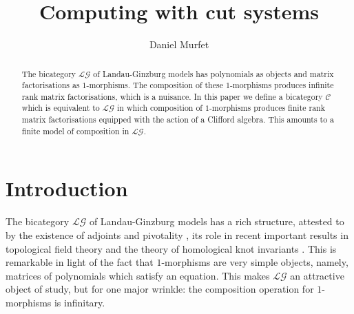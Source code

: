 \documentclass[english,letter paper,12pt,leqno]{article}
\theoremstyle{example}
\numberwithin{equation}{section}
\def\res{\operatorname{Res}}
\def\LG{\mathcal{LG}}
\def\L{\mathcal{C}}
\begin{document}
\def\Res{\res\!}
\newcommand{\ud}{\mathrm{d}}
\newcommand{\Ress}[1]{\res_{#1}\!}
\newcommand{\cat}[1]{\mathcal{#1}}
\newcommand{\lto}{\longrightarrow}
\newcommand{\xlto}[1]{\stackrel{#1}\lto}
\newcommand{\mf}[1]{\mathfrak{#1}}
\newcommand{\md}[1]{\mathscr{#1}}
\def\sus{\l}
\def\l{\,|\,}
\def\sgn{\textup{sgn}}

\title{Computing with cut systems}
\author{Daniel Murfet}

\maketitle

\begin{abstract}
The bicategory $\LG$ of Landau-Ginzburg models has polynomials as objects and matrix factorisations as $1$-morphisms. The composition of these $1$-morphisms produces infinite rank matrix factorisations, which is a nuisance. In this paper we define a bicategory $\L$ which is equivalent to $\LG$ in which composition of $1$-morphisms produces finite rank matrix factorisations equipped with the action of a Clifford algebra. This amounts to a finite model of composition in $\LG$.
\end{abstract}

\tableofcontents

\section{Introduction}

The bicategory $\LG$ of Landau-Ginzburg models has a rich structure, attested to by the existence of adjoints and pivotality \cite{lgdual}, its role in recent important results in topological field theory \cite{genorb,ade} and the theory of homological knot invariants \cite{kr0401268}. This is remarkable in light of the fact that $1$-morphisms are very simple objects, namely, matrices of polynomials which satisfy an equation. This makes $\LG$ an attractive object of study, but for one major wrinkle: the composition operation for $1$-morphisms is infinitary.
\end{document}
